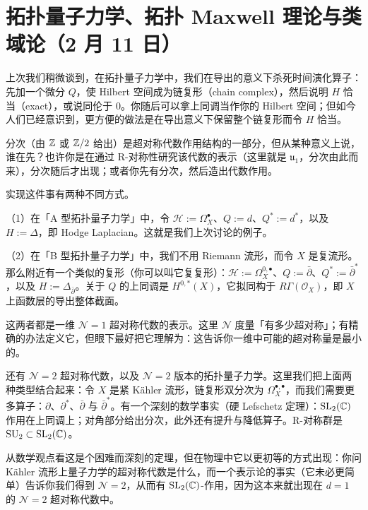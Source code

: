 \section[拓扑量子力学、拓扑 Maxwell 理论与类域论]{拓扑量子力学、拓扑 Maxwell 理论与类域论（2 月 11 日）}


上次我们稍微谈到，在拓扑量子力学中，我们在导出的意义下杀死时间演化算子：先加一个微分 $Q$，使 Hilbert 空间成为链复形（chain complex），然后说明 $H$ 恰当（exact），或说同伦于 $0$。你随后可以拿上同调当作你的 Hilbert 空间；但如今人们已经意识到，更方便的做法是在导出意义下保留整个链复形而令 $H$ 恰当。

分次（由 $\mathbb{Z}$ 或 $\mathbb{Z}/2$ 给出）是超对称代数作用结构的一部分，但从某种意义上说，谁在先？也许你是在通过 R-对称性研究该代数的表示（这里就是 $\mathfrak{u}_1$，分次由此而来），分次随后才出现；或者你先有分次，然后造出代数作用。

实现这件事有两种不同方式。

（1）在「A 型拓扑量子力学」中，令 $\mathcal{H} := \Omega^\bullet_X$、$Q := d$、$Q^* := d^*$，以及 $H := \Delta$，即 Hodge Laplacian。这就是我们上次讨论的例子。

（2）在「B 型拓扑量子力学」中，我们不用 Riemann 流形，而令 $X$ 是复流形。那么附近有一个类似的复形（你可以叫它复复形）：$\mathcal{H} := \Omega^{0,\bullet}_X$、$Q := \bar\partial$、$Q^* := \bar\partial^*$，以及 $H := \Delta_{\bar\partial}$。关于 $Q$ 的上同调是 $H^{0,*}(X)$，它拟同构于 $R\Gamma(\mathcal{O}_X)$，即 $X$ 上函数层的导出整体截面。

这两者都是一维 $\mathcal{N} = 1$ 超对称代数的表示。这里 $\mathcal{N}$ 度量「有多少超对称」；有精确的办法定义它，但眼下最好把它理解为：这告诉你一维中可能的超对称量是最小的。

还有 $\mathcal{N} = 2$ 超对称代数，以及 $\mathcal{N} = 2$ 版本的拓扑量子力学。这里我们把上面两种类型结合起来：令 $X$ 是紧 Kähler 流形，链复形双分次为 $\Omega^{\bullet,\bullet}_X$，而我们需要更多算子：$\partial$、$\partial^*$、$\bar\partial$ 与 $\bar\partial^*$。有一个深刻的数学事实（硬 Lefschetz 定理）：$\mathrm{SL}_2(\mathbb{C})$ 作用在上同调上；对角部分给出分次，此外还有提升与降低算子。R-对称群是 $\mathrm{SU}_2\subset\mathrm{SL}_2(\mathbb{C})$。

从数学观点看这是个困难而深刻的定理，但在物理中它以更初等的方式出现：你问 Kähler 流形上量子力学的超对称代数是什么，而一个表示论的事实（它未必更简单）告诉你我们得到 $\mathcal{N} = 2$，从而有 $\mathrm{SL}_2(\mathbb{C})$-作用，因为这本来就出现在 $d = 1$ 的 $\mathcal{N} = 2$ 超对称代数中。

